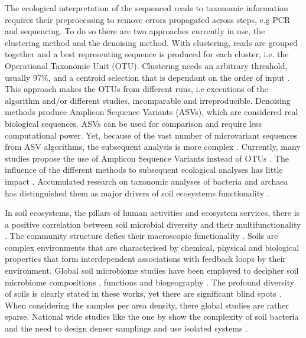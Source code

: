 The ecological interpretation of the sequenced reads to taxonomic information
requires their preprocessing to remove errors propagated across steps, e.g PCR and sequencing.
To do so there are two approaches currently in use, 
the clustering method and the denoising method. With clustering, reads are 
grouped together and a best representing sequence is produced for each 
cluster, i.e. the Operational Taxonomic Unit (OTU). 
Clustering needs an arbitrary threshold, usually 97\%, and a centroid selection
that is dependant on the order of input \parencite{zafeiropoulos2020pema}. 
This approach makes the OTUs 
from different runs, i.e executions of the algorithm and/or different studies,
incomparable and irreproducible.
Denoising methods produce Amplicon Sequence Variants (ASVs),
which are considered real biological sequences. 
ASVs can be used for comparison and require less computational power. 
Yet, because of the vast number of microvariant sequences from ASV algorithms,
the subsequent analysis is more complex \parencite{Glassman2018}.
Currently, many studies propose the use of Amplicon Sequence Variants
instead of OTUs \parencite{Callahan2017}.
The influence of the different methods to subsequent ecological analyses has
little impact \parencite{Glassman2018}.
Accumulated research on taxonomic analyses of bacteria and archaea has
distinguished them as major drivers of soil ecosystems functionality \parencite{Delgado-Baquerizo-atlas}.

In soil ecosystems, the pillars of human activities and ecosystem services, 
there is a positive correlation between soil microbial diversity and their multifunctionality \parencite{Delgado-Baquerizo2020}.
The community structure defies their macroscopic functionality \parencite{Bahram2018}.
Soils are complex environments that are characterised by chemical, physical and biological properties
that form interdependent associations with feedback loops by their environment. 
Global soil microbiome studies have been employed to decipher soil microbiome
compositions \parencite{thompson2017a-communal, Delgado-Baquerizo-atlas, Labouyrie2023},
functions \parencite{Bahram2018} and biogeography \parencite{Martiny2006, guerra2020Blind}.
The profound diversity of soils is clearly stated in these works, yet there are
significant blind spots \parencite{guerra2020Blind}.
When considering the samples per area density, there global studies are rather sparse.
National wide studies like the one by \textcite{Karimi2020} show the
complexity of soil bacteria and the need to design 
denser samplings and use isolated systems \parencite{Dini-Andreote2021}.

